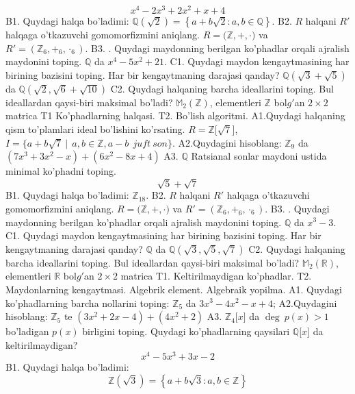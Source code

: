 \[x^{4} - 2x^{3} + 2x^{2} + x + 4\]
B1. Quydagi halqa bo'ladimi:
\(\mathbb{Q}\left( \sqrt{2} \right) = \left\{ a + b\sqrt{2}:a,b \in \mathbb{Q} \right\}\).
B2. \(R\) halqani \(R'\) halqaga o'tkazuvchi gomomorfizmini aniqlang.
\(R\mathbb{= (Z,} + , \cdot )\) va \(R' = (\mathbb{Z}_{6}, +_{6}, \cdot_{6})\).
B3. . Quydagi maydonning berilgan ko'phadlar orqali ajralish maydonini toping.
\(\mathbb{Q}\) da \(x^{4} - 5x^{2} + 21\).
C1. Quydagi maydon kengaytmasining har birining bazisini toping. Har bir kengaytmaning darajasi qanday?
\(\mathbb{Q}\left( \sqrt{3} + \sqrt{5} \right)\) da \(\mathbb{Q}\left( \sqrt{2},\sqrt{6} + \sqrt{10} \right)\)
C2. Quydagi halqaning barcha ideallarini toping. Bul ideallardan qaysi-biri maksimal bo'ladi?
\(\mathbb{M}_{2}\left( \mathbb{Z} \right)\), elementleri \(\mathbb{Z}\) bol\(g'\)an \(2 \times 2\) matrica
T1 Ko'phadlarning halqasi.
T2. Bo'lish algoritmi.
A1.Quydagi halqaning qism to'plamlari ideal bo'lishini ko'rsating.
\(R\mathbb{= Z\lbrack}\sqrt{7}\rbrack\), \(I = \{ a + b\sqrt{7}\ |\ \ a,b \in \mathbb{Z,}a - b\ \ juft\ son\}\).
A2.Quydagini hisoblang:
\(\mathbb{Z}_{9}\) da \(\left( 7x^{3} + 3x^{2} - x \right) + \left( 6x^{2} - 8x + 4 \right)\)
A3. \(\mathbb{Q}\) Ratsianal sonlar maydoni ustida minimal ko'phadni toping.
\[\sqrt{5} + \sqrt{7}\]
B1. Quydagi halqa bo'ladimi:
\(\mathbb{Z}_{18}\).
B2. \(R\) halqani \(R'\) halqaga o'tkazuvchi gomomorfizmini aniqlang.
\(R\mathbb{= (Z,} + , \cdot )\) va \(R' = (\mathbb{Z}_{6}, +_{6}, \cdot_{6})\).
B3. . Quydagi maydonning berilgan ko'phadlar orqali ajralish maydonini toping.
\(\mathbb{Q}\) da \(x^{3} - 3\).
C1. Quydagi maydon kengaytmasining har birining bazisini toping. Har bir kengaytmaning darajasi qanday?
\(\mathbb{Q}\) da \(\mathbb{Q}\left( \sqrt{3},\sqrt{5},\sqrt{7} \right)\)
C2. Quydagi halqaning barcha ideallarini toping. Bul ideallardan qaysi-biri maksimal bo'ladi?
\(\mathbb{M}_{2}\left( \mathbb{R} \right)\), elementleri \(\mathbb{R}\) bol\(g'\)an \(2 \times 2\) matrica
T1. Keltirilmaydigan ko'phadlar.
T2. Maydonlarning kengaytmasi. Algebrik element. Algebraik yopilma.
A1. Quydagi ko'phadlarning barcha nollarini toping:
\(\mathbb{Z}_{5}\) da \(3x^{3} - 4x^{2} - x + 4\);
A2.Quydagini hisoblang:
\(\mathbb{Z}_{5}\) te \(\left( 3x^{2} + 2x - 4 \right) + \left( 4x^{2} + 2 \right)\)
A3. \(\mathbb{Z}_{4}\lbrack x\rbrack\) da \(\deg\ p(x) > 1\) bo'ladigan \(p(x)\) birligini toping. Quydagi ko'phadlarning qaysilari \(\mathbb{Q\lbrack}x\rbrack\) da keltirilmaydigan?
\[x^{4} - 5x^{3} + 3x - 2\]
B1. Quydagi halqa bo'ladimi:
\[\mathbb{Z}\left( \sqrt{3} \right) = \left\{ a + b\sqrt{3}:a,b \in \mathbb{Z} \right\}\]
